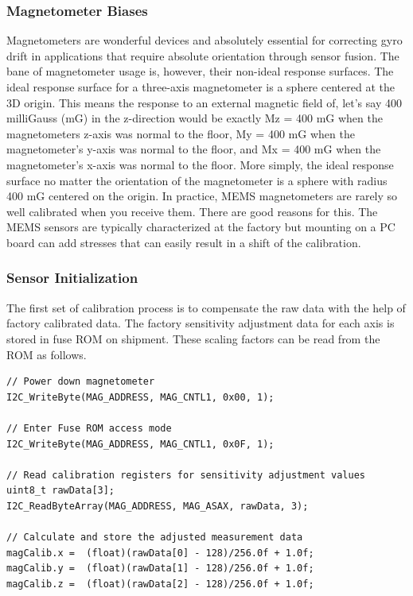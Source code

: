 \documentclass[a4paper,12pt,oneside]{book}
\begin{document}
\bigskip

\subsubsection{Magnetometer Biases}
Magnetometers are wonderful devices and absolutely essential for correcting gyro drift in applications that require absolute orientation through sensor fusion. The bane of magnetometer usage is, however, their non-ideal response surfaces. The ideal response surface for a three-axis magnetometer is a sphere centered at the 3D origin. This means the response to an external magnetic field of, let's say 400 milliGauss (mG) in the z-direction would be exactly Mz = 400 mG when the magnetometers z-axis was normal to the floor, My = 400 mG when the magnetometer's y-axis was normal to the floor, and Mx = 400 mG when the magnetometer's x-axis was normal to the floor. More simply, the ideal response surface no matter the orientation of the magnetometer is a sphere with radius 400 mG centered on the origin. In practice, MEMS magnetometers are rarely so well calibrated when you receive them. There are good reasons for this. The MEMS sensors are typically characterized at the factory but mounting on a PC board can add stresses that can easily result in a shift of the calibration.\cite{kris}\\

\clearpage

\subsubsection{Sensor Initialization}
The first set of calibration process is to compensate the raw data with the help of factory calibrated data. The factory sensitivity adjustment data for each axis is stored in fuse ROM on shipment. These scaling factors can be read from the ROM as follows.\\

\begin{verbatim}
// Power down magnetometer		
I2C_WriteByte(MAG_ADDRESS, MAG_CNTL1, 0x00, 1);	

// Enter Fuse ROM access mode	
I2C_WriteByte(MAG_ADDRESS, MAG_CNTL1, 0x0F, 1); 	

// Read calibration registers for sensitivity adjustment values
uint8_t rawData[3];
I2C_ReadByteArray(MAG_ADDRESS, MAG_ASAX, rawData, 3);

// Calculate and store the adjusted measurement data
magCalib.x =  (float)(rawData[0] - 128)/256.0f + 1.0f;   
magCalib.y =  (float)(rawData[1] - 128)/256.0f + 1.0f;
magCalib.z =  (float)(rawData[2] - 128)/256.0f + 1.0f;
\end{verbatim}
\end{document}
